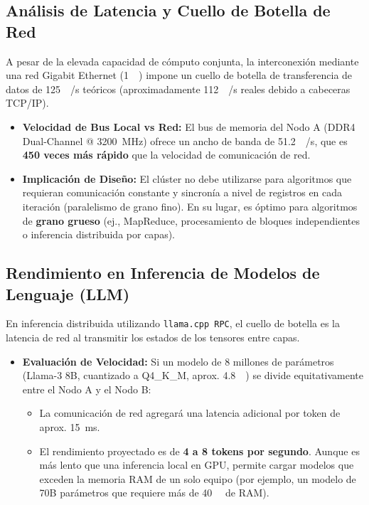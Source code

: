 \documentclass[11pt,a4paper]{article}
\begin{document}
\subsection{Análisis de Latencia y Cuello de Botella de Red}
A pesar de la elevada capacidad de cómputo conjunta, la interconexión mediante una red Gigabit Ethernet (\SI{1}{\giga{}}) impone un cuello de botella de transferencia de datos de \SI{125}{\mega\byte/\second} teóricos (aproximadamente \SI{112}{\mega\byte/\second} reales debido a cabeceras TCP/IP).
\begin{itemize}
    \item \textbf{Velocidad de Bus Local vs Red:} El bus de memoria del Nodo A (DDR4 Dual-Channel @ \SI{3200}{\mega\hertz}) ofrece un ancho de banda de \SI{51.2}{\giga\byte/\second}, que es \textbf{450 veces más rápido} que la velocidad de comunicación de red.
    \item \textbf{Implicación de Diseño:} El clúster no debe utilizarse para algoritmos que requieran comunicación constante y sincronía a nivel de registros en cada iteración (paralelismo de grano fino). En su lugar, es óptimo para algoritmos de \textbf{grano grueso} (ej., MapReduce, procesamiento de bloques independientes o inferencia distribuida por capas).
\end{itemize}

\subsection{Rendimiento en Inferencia de Modelos de Lenguaje (LLM)}
En inferencia distribuida utilizando \texttt{llama.cpp RPC}, el cuello de botella es la latencia de red al transmitir los estados de los tensores entre capas. 
\begin{itemize}
    \item \textbf{Evaluación de Velocidad:} Si un modelo de \num{8} millones de parámetros (Llama-3 8B, cuantizado a Q4\_K\_M, aprox. \SI{4.8}{\giga\byte}) se divide equitativamente entre el Nodo A y el Nodo B:
    \begin{itemize}
        \item La comunicación de red agregará una latencia adicional por token de aprox. \SI{15}{\milli\second}.
        \item El rendimiento proyectado es de \textbf{4 a 8 tokens por segundo}. Aunque es más lento que una inferencia local en GPU, permite cargar modelos que exceden la memoria RAM de un solo equipo (por ejemplo, un modelo de 70B parámetros que requiere más de \SI{40}{\giga\byte} de RAM).
    \end{itemize}
\end{itemize}
\end{document}

